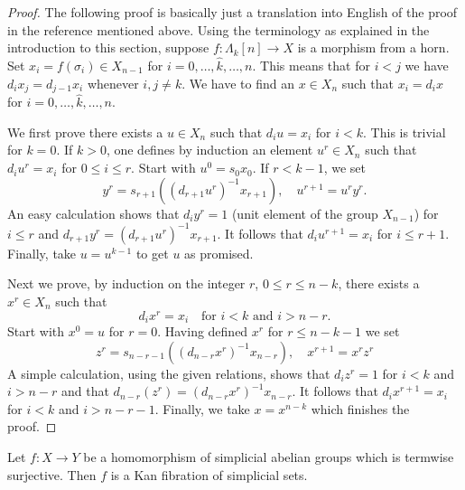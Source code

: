 \begin{proof}
The following proof is basically just a translation into English
of the proof in the reference mentioned above.
Using the terminology as explained in the introduction to this section,
suppose $f : \Lambda_k[n] \to X$ is a morphism from a horn. Set
$x_i = f(\sigma_i) \in X_{n - 1}$ for $i = 0, \ldots, \hat k, \ldots, n$.
This means that for $i < j$ we have $d_i x_j = d_{j - 1} x_i$
whenever $i, j \not = k$.
We have to find an $x \in X_n$ such that $x_i = d_ix$ for
$i = 0, \ldots, \hat k, \ldots, n$.

\medskip\noindent
We first prove there exists a $u \in X_n$ such that $d_i u = x_i$
for $i < k$. This is trivial for $k = 0$. If $k > 0$, one defines by
induction an element $u^r \in X_n$ such that $d_i u^r = x_i$ for
$0 \leq i \leq r$. Start with $u^0 = s_0x_0$. If $r < k - 1$,
we set
$$
y^r = s_{r + 1}((d_{r + 1}u^r)^{-1}x_{r + 1}),\quad
u^{r + 1} = u^r y^r.
$$
An easy calculation shows that $d_iy^r = 1$ (unit element of the group
$X_{n - 1}$) for $i \leq r$ and
$d_{r + 1}y^r = (d_{r + 1}u^r)^{-1}x_{r + 1}$. It follows that
$d_iu^{r + 1} = x_i$ for $i \leq r + 1$. Finally, take $u = u^{k - 1}$
to get $u$ as promised.

\medskip\noindent
Next we prove, by induction on the integer $r$, $0 \leq r \leq n - k$,
there exists a $x^r \in X_n$ such that
$$
d_i x^r = x_i\quad\text{for }i < k\text{ and }i > n - r.
$$
Start with $x^0 = u$ for $r = 0$. Having defined $x^r$ for $r \leq n - k - 1$
we set
$$
z^r = s_{n - r - 1}((d_{n - r}x^r)^{-1}x_{n - r}),\quad x^{r + 1} = x^rz^r
$$
A simple calculation, using the given relations, shows that
$d_iz^r = 1$ for $i < k$ and $i > n - r$ and that
$d_{n - r}(z^r) = (d_{n - r}x^r)^{-1}x_{n - r}$. It follows that
$d_ix^{r + 1} = x_i$ for $i < k$ and $i > n - r - 1$. Finally, we
take $x = x^{n - k}$ which finishes the proof.
\end{proof}

\begin{lemma}
\label{lemma-surjection-simplicial-abelian-groups-kan}
Let $f : X \to Y$ be a homomorphism of simplicial abelian groups
which is termwise surjective. Then $f$ is a Kan fibration of
simplicial sets.
\end{lemma}

